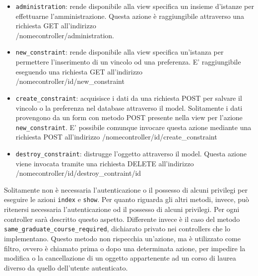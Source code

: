 \documentclass[11pt,a4paper]{article}
\begin{document}
\begin{itemize}
 \item \verb|administration|: rende disponibile alla view specifica un insieme d'istanze per effettuarne l'amministrazione. Questa azione è raggiungibile attraverso una richiesta GET all'indirizzo \\ /nomecontroller/administration.
 \item \verb|new_constraint|: rende disponibile alla view specifica un'istanza per permettere l'inserimento di un vincolo od una preferenza. E' raggiungibile eseguendo una richiesta GET all'indirizzo \\ /nomecontroller/id/new\_constraint
 \item \verb|create_constraint|: acquisisce i dati da una richiesta POST per salvare il vincolo o la preferenza nel database attraverso il model. Solitamente i dati provengono da un form con metodo POST presente nella view per l'azione \verb|new_constraint|. E' possibile comunque invocare questa azione mediante una richiesta POST all'indirizzo /nomecontroller/id/create\_constraint
 \item \verb|destroy_constraint|: distrugge l'oggetto attraverso il model. Questa azione viene invocata tramite una richiesta DELETE all'indirizzo /nomecontroller/id/destroy\_contraint/id
\end{itemize}
Solitamente non è necessaria l'autenticazione o il possesso di alcuni privilegi per eseguire le azioni \verb|index| e \verb|show|. Per quanto riguarda gli altri metodi, invece, può ritenersi necessaria l'autenticazione od il possesso di alcuni privilegi. Per ogni controller sarà descritto questo aspetto.
Differente invece è il caso del metodo \verb|same_graduate_course_required|, dichiarato privato nei controllers che lo implementano. Questo metodo non rispecchia un'azione, ma è utilizzato come filtro, ovvero è chiamato prima o dopo una determinata azione, per impedire la modifica o la cancellazione di un oggetto appartenente ad un corso di laurea diverso da quello dell'utente autenticato.
\end{document}
